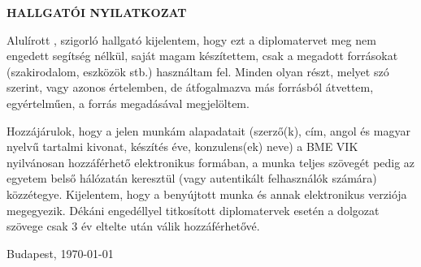 \setcounter{page}{1}
\begin{center}
\large
\textbf{HALLGATÓI NYILATKOZAT}\\
\end{center}

Alulírott \emph{\szerzo}, szigorló hallgató kijelentem, hogy ezt a diplomatervet meg nem engedett segítség nélkül, saját magam készítettem, csak a megadott forrásokat (szakirodalom, eszközök stb.) használtam fel. Minden olyan részt, melyet szó szerint, vagy azonos értelemben, de átfogalmazva más forrásból átvettem, egyértelműen, a forrás megadásával megjelöltem.

Hozzájárulok, hogy a jelen munkám alapadatait (szerző(k), cím, angol és magyar nyelvű tartalmi kivonat, készítés éve, konzulens(ek) neve) a BME VIK nyilvánosan hozzáférhető elektronikus formában, a munka teljes szövegét pedig az egyetem belső hálózatán keresztül (vagy autentikált felhasználók számára) közzétegye. Kijelentem, hogy a benyújtott munka és annak elektronikus verziója megegyezik. Dékáni engedéllyel titkosított diplomatervek esetén a dolgozat szövege csak 3 év eltelte után válik hozzáférhetővé.

\begin{flushleft}
\vspace*{1cm}
Budapest, \today
\end{flushleft}

\begin{flushright}
    \vspace*{1cm}
    \makebox[7cm]{\rule{6cm}{.4pt}}\\
    \makebox[7cm]{\emph{\szerzo}}\\
\end{flushright}
\thispagestyle{empty}

\vfill
\clearpage
